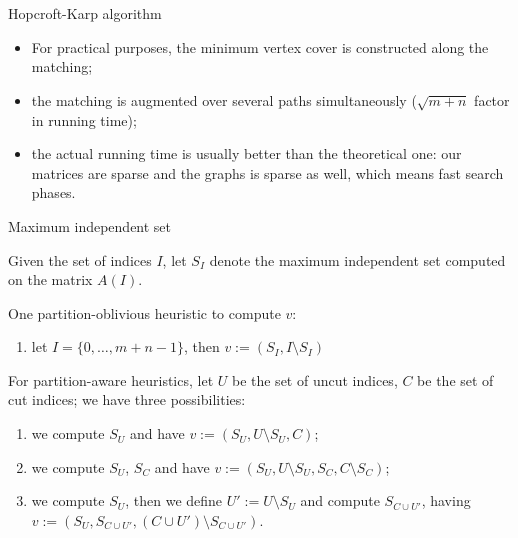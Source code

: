 \begin{frame}{Hopcroft-Karp algorithm}
\begin{itemize}\itemsep=0.4cm
		\item For practical purposes, the minimum vertex cover is constructed along the matching;
		\item the matching is augmented over several paths simultaneously ($\sqrt{m+n}$ factor in running time);
		\item the actual running time is usually better than the theoretical one: our matrices are sparse and the graphs is sparse as well, which means fast search phases.
	\end{itemize}
\end{frame}

\begin{frame}{Maximum independent set}

	Given the set of indices $I$, let $S_I$ denote the maximum independent set computed on the matrix $A(I)$.

	One partition-oblivious heuristic to compute $v$: 

	\begin{enumerate}
		\item let $I = \{0,\dots,m+n-1\}$, then $v := (S_I,I \setminus S_I)$
	\end{enumerate}


	For partition-aware heuristics, let $U$ be the set of uncut indices, $C$ be the set of cut indices; we have three possibilities:

	\begin{enumerate}
	\item we compute $S_U$ and have $v := (S_U,U \setminus S_U, C)$;
	\item we compute $S_U$, $S_C$ and have $v := (S_U, U \setminus S_U, S_C, C \setminus S_C)$;
	\item we compute $S_U$, then we define $U' := U \setminus S_U$ and compute $S_{C \cup U'}$, having $v:= (S_U, S_{C \cup U'}, (C \cup U') \setminus S_{C \cup U'})$.

	\end{enumerate}
\end{frame}


